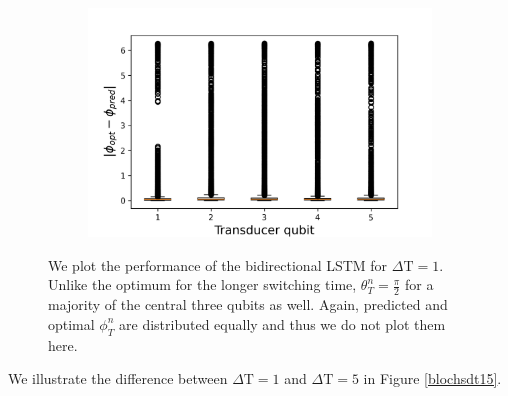 \begin{figure}
\begin{subfigure}{0.45\textwidth}
	\end{subfigure}
	\begin{subfigure}{0.45\textwidth}
		\centering
		\includegraphics[width=\textwidth]{img/delta_phi_box_dt_12}
	\end{subfigure}
	\caption{We plot the performance of the bidirectional LSTM for $\Delta \mathrm{T} = 1$. Unlike the optimum for the longer switching time, $\theta_T^n = \frac{\pi}{2}$ for a majority of the central three qubits as well. Again, predicted and optimal $\phi^n_T$ are distributed equally and thus we do not plot them here.}
	\label{dt1box}
\end{figure}

We illustrate the difference between $\Delta \mathrm{T} = 1$ and $\Delta \mathrm{T} = 5$ in Figure \ref{blochsdt15}.

